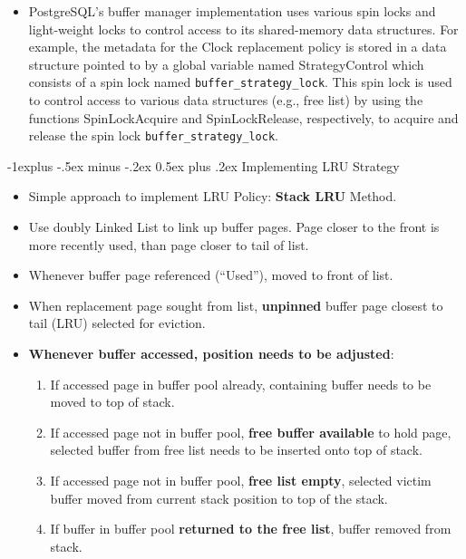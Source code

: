 \documentclass[10pt, landscape]{article}
\makeatletter
\renewcommand{\subsection}{\@startsection{subsection}{2}{0mm}%
                                {-1explus -.5ex minus -.2ex}%
                                {0.5ex plus .2ex}%
                                {\normalfont\normalsize\bfseries}}
\newcommand{\code}[1]{\colorbox{gray!25!}{\lstinline|#1|}}
\makeatother
\begin{document}
\begin{multicols*}{3}
\columnbreak

\begin{itemize}
\item PostgreSQL’s buffer manager implementation uses various spin locks and light-weight locks to control access to its shared-memory data structures. For example, the metadata for the Clock replacement policy is stored in a data structure pointed to by a global variable named StrategyControl which consists of a spin lock named \code{buffer_strategy_lock}. This spin lock is used to control access to various data structures (e.g., free list) by using the functions SpinLockAcquire and SpinLockRelease, respectively, to acquire and release the spin lock \code{buffer_strategy_lock}.
\end{itemize}

\subsection{Implementing LRU Strategy}
\begin{itemize}
\item Simple approach to implement LRU Policy: \textbf{Stack LRU} Method.
\item Use doubly Linked List to link up buffer pages. Page closer to the front is more recently used, than page closer to tail of list.
\item Whenever buffer page referenced (``Used''), moved to front of list. 
\item When replacement page sought from list, \textbf{unpinned} buffer page closest to tail (LRU) selected for eviction.
\item \textbf{Whenever buffer accessed, position needs to be adjusted}:
\begin{enumerate}
\item If accessed page in buffer pool already, containing buffer needs to be moved to top of stack.
\item If accessed page not in buffer pool, \textbf{free buffer available} to hold page, selected buffer from free list needs to be inserted onto top of stack.
\item If accessed page not in buffer pool, \textbf{free list empty}, selected victim buffer moved from current stack position to top of the stack.
\item If buffer in buffer pool \textbf{returned to the free list}, buffer removed from stack.
\end{enumerate}
\end{itemize}


\end{multicols*}
\end{document}
